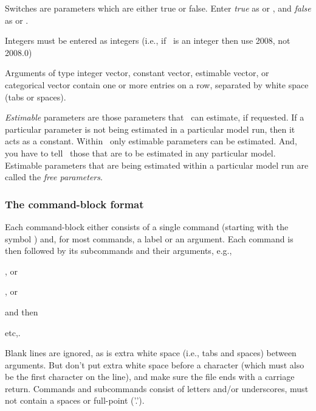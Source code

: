 Switches are parameters which are either true or false. Enter \emph{true} as  or , and \emph{false} as  or . 

Integers must be entered as integers (i.e., if \ is an integer then use 2008, not 2008.0)

Arguments of type integer vector, constant vector, estimable vector, or categorical vector contain one or more entries on a row, separated by white space (tabs or spaces). 

\emph{Estimable} parameters are those parameters that \SPM\ can estimate, if requested. If a particular parameter is not being estimated in a particular model run, then it acts as a constant.  Within \SPM\, only estimable parameters can be estimated. And, you have to tell \SPM\ those that are to be estimated in any particular model. Estimable parameters that are being estimated within a particular model run are called the \emph{free parameters}.

\subsubsection{The command-block format}

Each command-block either consists of a single command (starting with the symbol \@) and, for most commands, a label or an argument. Each command is then followed by its subcommands and their arguments, e.g., 

\begin{description}
\item {}, or 
\item {} , or
\item {} 
\end{description}

and then
\begin{description}
\item {} 
\item {} 
\item etc,.
\end{description}

Blank lines are ignored, as is extra white space (i.e., tabs and spaces) between arguments. But don't put extra white space before a \command{} character (which must also be the first character on the line), and make sure the file ends with a carriage return. Commands and subcommands consist of letters and/or underscores, must not contain a spaces or full-point ('.').

